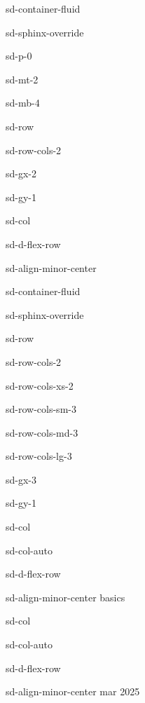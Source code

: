 \documentclass[letterpaper,10pt,italian]{jupyterBook}
\begin{document}
\begin{sphinxuseclass}{sd-container-fluid}
\begin{sphinxuseclass}{sd-sphinx-override}
\begin{sphinxuseclass}{sd-p-0}
\begin{sphinxuseclass}{sd-mt-2}
\begin{sphinxuseclass}{sd-mb-4}
\begin{sphinxuseclass}{sd-row}
\begin{sphinxuseclass}{sd-row-cols-2}
\begin{sphinxuseclass}{sd-gx-2}
\begin{sphinxuseclass}{sd-gy-1}
\begin{sphinxuseclass}{sd-col}
\begin{sphinxuseclass}{sd-d-flex-row}
\begin{sphinxuseclass}{sd-align-minor-center}
\begin{sphinxuseclass}{sd-container-fluid}
\begin{sphinxuseclass}{sd-sphinx-override}
\begin{sphinxuseclass}{sd-row}
\begin{sphinxuseclass}{sd-row-cols-2}
\begin{sphinxuseclass}{sd-row-cols-xs-2}
\begin{sphinxuseclass}{sd-row-cols-sm-3}
\begin{sphinxuseclass}{sd-row-cols-md-3}
\begin{sphinxuseclass}{sd-row-cols-lg-3}
\begin{sphinxuseclass}{sd-gx-3}
\begin{sphinxuseclass}{sd-gy-1}
\begin{sphinxuseclass}{sd-col}
\begin{sphinxuseclass}{sd-col-auto}
\begin{sphinxuseclass}{sd-d-flex-row}
\begin{sphinxuseclass}{sd-align-minor-center}
\sphinxAtStartPar
basics

\end{sphinxuseclass}
\end{sphinxuseclass}
\end{sphinxuseclass}
\end{sphinxuseclass}
\begin{sphinxuseclass}{sd-col}
\begin{sphinxuseclass}{sd-col-auto}
\begin{sphinxuseclass}{sd-d-flex-row}
\begin{sphinxuseclass}{sd-align-minor-center}
 mar 2025


\end{sphinxuseclass}
\end{sphinxuseclass}
\end{sphinxuseclass}
\end{sphinxuseclass}
\end{sphinxuseclass}
\end{sphinxuseclass}
\end{sphinxuseclass}
\end{sphinxuseclass}
\end{sphinxuseclass}
\end{sphinxuseclass}
\end{sphinxuseclass}
\end{sphinxuseclass}
\end{sphinxuseclass}
\end{sphinxuseclass}
\end{sphinxuseclass}
\end{sphinxuseclass}
\end{sphinxuseclass}
\end{sphinxuseclass}
\end{sphinxuseclass}
\end{sphinxuseclass}
\end{sphinxuseclass}
\end{sphinxuseclass}
\end{sphinxuseclass}
\end{sphinxuseclass}
\end{sphinxuseclass}
\end{sphinxuseclass}
\end{document}
